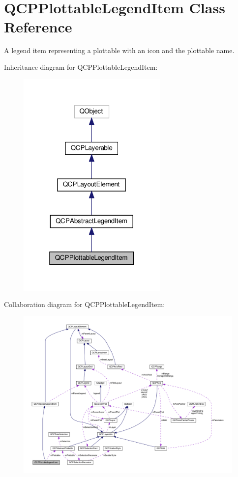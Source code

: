 \hypertarget{classQCPPlottableLegendItem}{}\section{Q\+C\+P\+Plottable\+Legend\+Item Class Reference}
\label{classQCPPlottableLegendItem}


A legend item representing a plottable with an icon and the plottable name.  




Inheritance diagram for Q\+C\+P\+Plottable\+Legend\+Item\+:\nopagebreak
\begin{figure}[H]
\begin{center}
\leavevmode
\includegraphics[width=208pt]{classQCPPlottableLegendItem__inherit__graph}
\end{center}
\end{figure}


Collaboration diagram for Q\+C\+P\+Plottable\+Legend\+Item\+:\nopagebreak
\begin{figure}[H]
\begin{center}
\leavevmode
\includegraphics[width=350pt]{classQCPPlottableLegendItem__coll__graph}
\end{center}
\end{figure}
